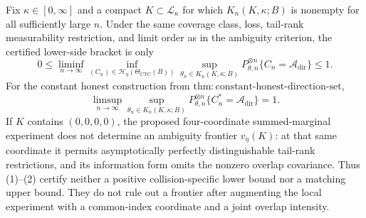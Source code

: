 Fix \(\kappa\in[0,\infty]\) and a compact \(K\subset\mathcal L_\kappa\) for which \(K_n(K,\kappa;B)\) is nonempty for all sufficiently large \(n\).  Under the same coverage class, loss, tail-rank measurability restriction, and limit order as in the ambiguity criterion, the certified lower-side bracket is only
\[
 0\leq
 \liminf_{n\to\infty}\inf_{(C_n)\in\mathcal H_\eta(\Theta_{\mathrm{CTC}}(B))}
 \sup_{\theta_n\in K_n(K,\kappa;B)}
 P_{\theta,n}^{\otimes n}\{C_n=\mathcal A_{\mathrm{dir}}\}
 \leq1. \tag{1}
\]
For the constant honest construction from \(\mathrm{thm{:}constant\text{-}honest\text{-}direction\text{-}set}\),
\[
 \limsup_{n\to\infty}\sup_{\theta_n\in K_n(K,\kappa;B)}
 P_{\theta,n}^{\otimes n}\{C_n^*=\mathcal A_{\mathrm{dir}}\}=1. \tag{2}
\]
If \(K\) contains \((0,0,0,0)\), the proposed four-coordinate summed-marginal experiment does not determine an ambiguity frontier \(v_\eta(K)\): at that same coordinate it permits asymptotically perfectly distinguishable tail-rank restrictions, and its information form omits the nonzero overlap covariance.  Thus (1)--(2) certify neither a positive collision-specific lower bound nor a matching upper bound.  They do not rule out a frontier after augmenting the local experiment with a common-index coordinate and a joint overlap intensity.